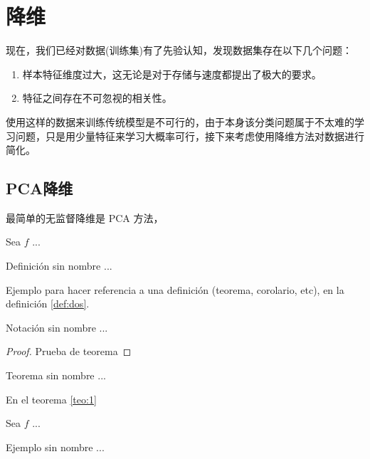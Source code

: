 \documentclass[fleqn]{Paquetes/RevDigMatEduInt}
\begin{document}
\section{降维}
现在，我们已经对数据(训练集)有了先验认知，发现数据集存在以下几个问题：
\begin{observacion}
\begin{enumerate}
	\item 样本特征维度过大，这无论是对于存储与速度都提出了极大的要求。
	\item 特征之间存在不可忽视的相关性。
\end{enumerate}
\end{observacion}
使用这样的数据来训练传统模型是不可行的，由于本身该分类问题属于不太难的学习问题，只是用少量特征来学习大概率可行，接下来考虑使用降维方法对数据进行简化。
\subsection{PCA降维}
最简单的无监督降维是 PCA 方法，



\begin{definicion}
	Sea $f$ ...
\end{definicion}

\begin{definicion}
Definición sin nombre ...
\end{definicion}

Ejemplo para hacer referencia a una definición (teorema, corolario, etc), en la definición \ref{def:dos}.

\begin{notacion}
	Notación sin nombre ...
\end{notacion}



\begin{proof}
	Prueba de teorema
\end{proof}

\begin{teorema}
Teorema sin nombre ...
\end{teorema}

En el teorema \ref{teo:1}

\begin{ejemplo}
	Sea $f$ ...
\end{ejemplo}

\begin{ejemplo}
	Ejemplo sin nombre ...
\end{ejemplo}
\end{document}
